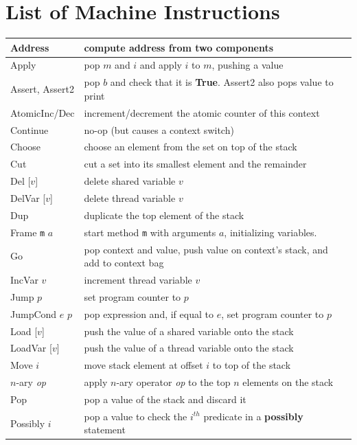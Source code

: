 \documentclass{report}
\begin{document}
\chapter{List of Machine Instructions}
\label{ap:harmonybytecode}

{\small
\begin{tabular}{|l|l|}
\hline
Address & compute address from two components \\
\hline
Apply & pop $m$ and $i$ and apply $i$ to $m$, pushing a value \\
\hline
Assert, Assert2 & pop $b$ and check that it is \textbf{True}.  Assert2 also pops value to print \\
\hline
AtomicInc/Dec & increment/decrement the atomic counter of this context \\
\hline
Continue & no-op (but causes a context switch) \\
\hline
Choose & choose an element from the set on top of the stack \\
\hline
Cut & cut a set into its smallest element and the remainder \\
\hline
Del [$v$] & delete shared variable $v$ \\
\hline
DelVar [$v$] & delete thread variable $v$ \\
\hline
Dup & duplicate the top element of the stack \\
\hline
Frame \texttt{m} $a$ & start method \texttt{m} with arguments $a$,
initializing variables.  \\
\hline
Go & pop context and value, push value on context's stack, and add to context bag \\
\hline
IncVar $v$ & increment thread variable $v$ \\
\hline
Jump $p$ & set program counter to $p$ \\
\hline
JumpCond $e$ $p$ & pop expression and, if equal to $e$, set program counter to $p$ \\
\hline
Load [$v$] & push the value of a shared variable onto the stack \\
\hline
LoadVar [$v$] & push the value of a thread variable onto the stack \\
\hline
Move $i$ & move stack element at offset $i$ to top of the stack \\
\hline
$n$-ary \textit{op} & apply $n$-ary operator \textit{op} to the top $n$ elements on the stack \\
\hline
Pop & pop a value of the stack and discard it \\
\hline
Possibly $i$ & pop a value to check the $i^{th}$ predicate in a \textbf{possibly} statement \\

\end{tabular}}
\end{document}

